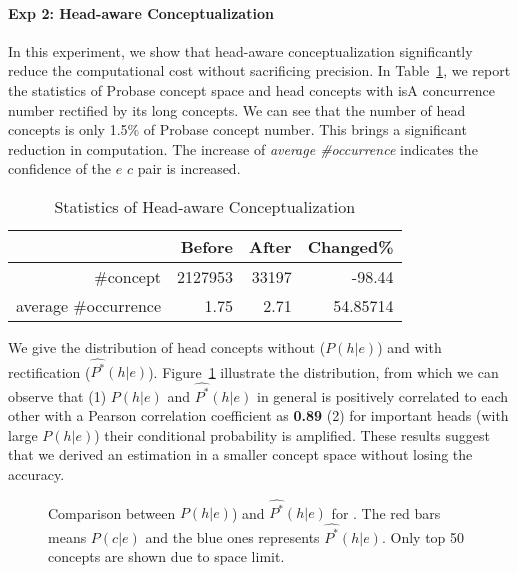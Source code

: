 \paragraph*{Exp 2: Head-aware Conceptualization}
In this experiment, we show that head-aware conceptualization significantly reduce the computational cost without sacrificing precision. 
In Table~\ref{tab:nhc}, we report the statistics of Probase concept space and head concepts with isA concurrence number rectified by its long concepts. 
We can see that the number of head concepts is only 1.5\% of Probase concept number. This brings a significant reduction in computation. 
The increase of \emph{average \#occurrence} indicates the confidence of the $e$ \isa $c$ pair is increased.


\begin{table}[htbp]
\vspace{-4mm}
  \centering
  \caption{Statistics of Head-aware Conceptualization}
  \small
    \begin{tabular}{rrrr}
    \toprule
          & Before & After & Changed\% \\
    \midrule
    \#concept & 2127953 & 33197 & -98.44 \\
    average \#occurrence & 1.75  & 2.71  & 54.85714 \\
    \bottomrule
    \end{tabular}%
  \label{tab:nhc}%
\end{table}%


We give the distribution of head concepts without ($P(h|e)$) and with rectification ($\hat{P^*}(h|e)$).  Figure~\ref{fig:hac} illustrate the distribution, from which we can observe that (1) $P(h|e)$ and $\hat{P^*}(h|e)$ in general is positively correlated to each other with a Pearson correlation coefficient as {\bf 0.89} (2) for important heads (with large $P(h|e)$) their conditional probability is amplified. These results suggest that we derived an estimation in a smaller concept space without losing the accuracy.


\begin{figure}[!tb]
\centering
\small
{}
\vspace{-8mm}
\caption{Comparison between $P(h|e)$) and $\hat{P^*}(h|e)$ for . \small The red bars means $P(c|e)$ and the blue ones represents $\hat{P^*}(h|e)$. Only top 50 concepts are shown due to space limit.  }
\label{fig:hac}
\vspace{-6mm}
%
\vspace{-6mm}
\end{figure}



